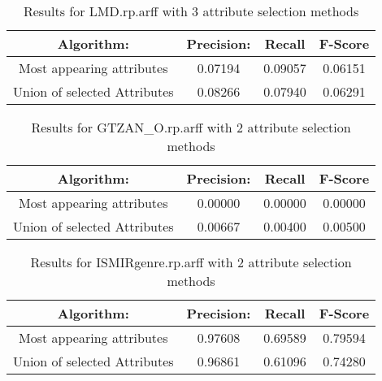 \begin{table}[p]
\begin{center}
\begin{tabular}{|c|c|c|c|}
\hline Algorithm: & Precision: & Recall & F-Score\\
\hline Most appearing attributes & 0.07194 & 0.09057 & 0.06151\\
\hline Union of selected Attributes & 0.08266 & 0.07940 & 0.06291\\

\hline
\end{tabular}
\caption{Results for LMD.rp.arff with 3 attribute selection methods}
\label{table:classifier:LMD3}
\end{center}
\end{table}






\begin{table}[p]
\begin{center}
\begin{tabular}{|c|c|c|c|}
\hline Algorithm: & Precision: & Recall & F-Score\\
\hline Most appearing attributes & 0.00000 & 0.00000 & 0.00000\\
\hline Union of selected Attributes & 0.00667 & 0.00400 & 0.00500\\

\hline
\end{tabular}
\caption{Results for GTZAN\_O.rp.arff with 2 attribute selection methods}
\label{table:classifier:GTZAN\_O2}
\end{center}
\end{table}


\begin{table}[p]
\begin{center}
\begin{tabular}{|c|c|c|c|}
\hline Algorithm: & Precision: & Recall & F-Score\\
\hline Most appearing attributes & 0.97608 & 0.69589 & 0.79594\\
\hline Union of selected Attributes & 0.96861 & 0.61096 & 0.74280\\

\hline
\end{tabular}
\caption{Results for ISMIRgenre.rp.arff with 2 attribute selection methods}
\label{table:classifier:ISMIRgenre2}
\end{center}
\end{table}


